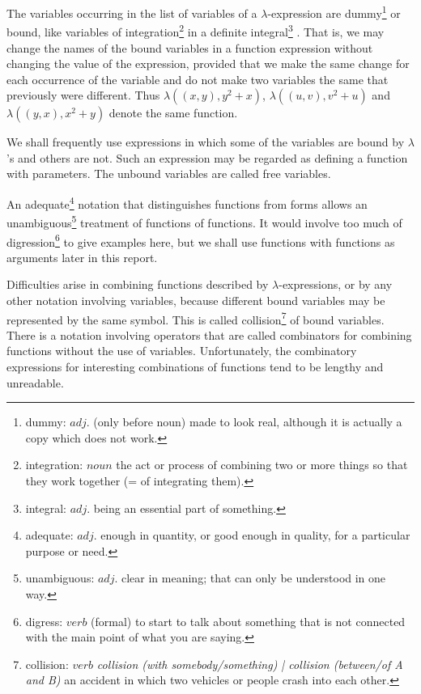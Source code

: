 \documentclass[11pt, a4paper]{article}
\begin{document}
The variables occurring in the list of variables of a $\lambda$-expression are
dummy\footnote{dummy: $adj.$ (only before noun) made to look real, although it
  is actually a copy which does not work.}
or bound, like variables of
integration\footnote{integration: $noun$ the act or process of combining two or
  more things so that they work together (= of integrating them).}
in a definite
integral\footnote{integral: $adj.$ being an essential part of something.}
. That is,
we may change the names of the bound variables in a function expression without
changing the value of the expression, provided that we make the same change for
each occurrence of the variable and do not make two variables the same that
previously were different. Thus $\lambda((x, y), y^2 + x)$, $\lambda((u, v), v^2
+ u)$ and $\lambda((y, x), x^2 + y)$ denote the same function.

We shall frequently use expressions in which some of the variables are bound
by $\lambda$'s and others are not. Such an expression may be regarded as
defining a function with parameters. The unbound variables are called free
variables.

An
adequate\footnote{adequate: $adj.$ enough in quantity, or good enough in
  quality, for a particular purpose or need.}
notation that distinguishes functions from forms allows an
unambiguous\footnote{unambiguous: $adj.$ clear in meaning; that can only be
  understood in one way.}
treatment of functions of functions. It would involve too much of
digression\footnote{digress: $verb$ (formal) to start to talk about something
  that is not connected with the main point of what you are saying.}
to give examples here, but we shall use functions with functions as
arguments later in this report.

Difficulties arise in combining functions described by $\lambda$-expressions, or
by any other notation involving variables, because different bound variables may
be represented by the same symbol. This is called
collision\footnote{collision: $verb$ \textit{collision (with somebody/something)
    | collision (between/of A and B)} an accident in which two vehicles or
  people crash into each other.}
of bound
variables. There is a notation involving operators that are called combinators
for combining functions without the use of variables. Unfortunately, the
combinatory expressions for interesting combinations of functions tend to be
lengthy and unreadable.
\end{document}
